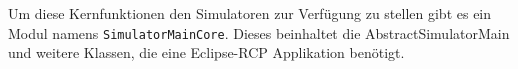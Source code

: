 Um diese Kernfunktionen den Simulatoren zur Verfügung zu stellen gibt es ein Modul namens \texttt{SimulatorMainCore}. Dieses beinhaltet die AbstractSimulatorMain und weitere Klassen, die eine Eclipse-RCP Applikation benötigt.


\newpage

\newpage

\newpage




